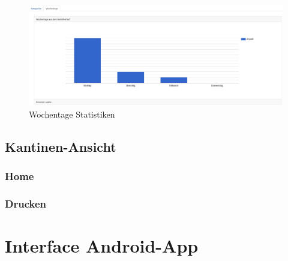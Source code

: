 \begin{figure}[htp]
    \centering
    \includegraphics[scale=0.3]{pics/statistiken_wochentage.JPG}
    \caption{Wochentage Statistiken}
    \label{fig:impl:WeekDaysCategories}
\end{figure}

\pagebreak

\subsection {Kantinen-Ansicht}
\subsubsection {Home}
\subsubsection {Drucken}

\section {Interface Android-App}

